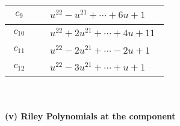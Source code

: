 \documentclass[1p]{elsarticle_modified}
\theoremstyle{definition}
\begin{document}
\begin{tabular}{m{50pt}|m{274pt}}
\hline $$\begin{aligned}c_{9}\end{aligned}$$&$\begin{aligned}
&u^{22}- u^{21}+\cdots+6 u+1
\end{aligned}$\\
\hline $$\begin{aligned}c_{10}\end{aligned}$$&$\begin{aligned}
&u^{22}+2 u^{21}+\cdots+4 u+11
\end{aligned}$\\
\hline $$\begin{aligned}c_{11}\end{aligned}$$&$\begin{aligned}
&u^{22}-2 u^{21}+\cdots-2 u+1
\end{aligned}$\\
\hline $$\begin{aligned}c_{12}\end{aligned}$$&$\begin{aligned}
&u^{22}-3 u^{21}+\cdots+u+1
\end{aligned}$\\
\hline
\end{tabular}\\~\\
\newpage\renewcommand{\arraystretch}{1}
\flushleft \textbf{(v) Riley Polynomials at the component}\newline \\
\end{document}
